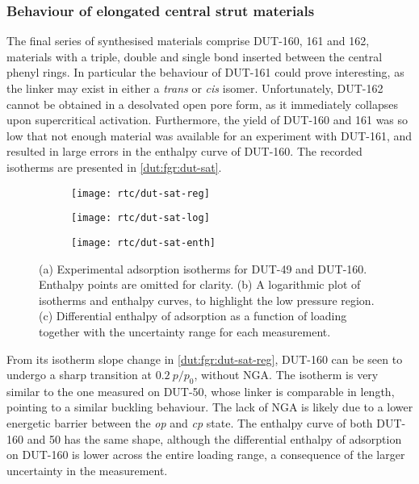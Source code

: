 \subsubsection{Behaviour of elongated central strut materials}

The final series of synthesised materials comprise DUT-160, 
161 and 162, materials with a triple, double and single bond 
inserted between the central phenyl rings. In particular 
the behaviour of DUT-161 could prove interesting, as the linker 
may exist in either a \textit{trans} or \textit{cis} isomer.
Unfortunately, DUT-162 cannot be obtained in a desolvated open 
pore form, as it 
immediately collapses upon supercritical activation. Furthermore,
the yield of DUT-160 and 161 was so low that not enough 
material was available for an experiment with DUT-161, and resulted
in large errors in the enthalpy curve of DUT-160.
The recorded isotherms are presented in \autoref{dut:fgr:dut-sat}.

\begin{figure}[htb]
    \centering
    \begin{subfigure}{0.33\linewidth}
        \texttt{[image: rtc/dut-sat-reg]}%
        \caption{}\label{dut:fgr:dut-sat-reg}
    \end{subfigure}%
    \begin{subfigure}{0.33\linewidth}
        \texttt{[image: rtc/dut-sat-log]}%
        \caption{}\label{dut:fgr:dut-sat-log}
    \end{subfigure}%
    \begin{subfigure}{0.33\linewidth}
        \texttt{[image: rtc/dut-sat-enth]}%
        \caption{}\label{dut:fgr:dut-sat-enth}
    \end{subfigure}%
    \caption{(a) Experimental adsorption isotherms for DUT-49 and 
    DUT-160. Enthalpy points are omitted for clarity. 
    (b) A logarithmic plot of isotherms and enthalpy curves,
    to highlight the low pressure region. 
    (c) Differential enthalpy of adsorption as a function of loading
    together with the uncertainty range for each measurement.}%
    \label{dut:fgr:dut-sat}
\end{figure}

From its isotherm slope change in \autoref{dut:fgr:dut-sat-reg},
DUT-160 can be seen to undergo a sharp transition at 
\(0.2~p/p_0\), without NGA. The isotherm is very similar to the one
measured on DUT-50, whose linker is comparable in length, pointing to 
a similar buckling behaviour. The lack of NGA is likely due to 
a lower energetic barrier between the \textit{op} and \textit{cp}
state. The enthalpy curve of both DUT-160 and 50 has the same 
shape, although the differential enthalpy of adsorption on 
DUT-160 is lower across the entire loading range, a consequence of the
larger uncertainty in the measurement.

